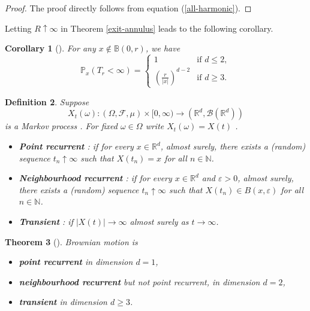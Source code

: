 \documentclass[11pt, a4paper, oneside]{report}
\numberwithin{equation}{section}
\newtheorem{theorem}{Theorem}[chapter]
\newtheorem{corollary}[theorem]{Corollary}
\newtheorem{definition}[theorem]{Definition}
\begin{document}
\begin{proof}
The proof directly follows from equation (\ref{all-harmonic}).
\end{proof}
\noindent Letting \( R \uparrow \infty \) in Theorem \ref{exit-annulus} leads to the following corollary.

\begin{corollary}[{\cite[Corollary 3.19]{PeresMortersBook}}]
For any \( x \notin \mathbb{B}(0, r) \), we have
\[
\mathbb{P}_x(T_r < \infty) =
\begin{cases}
1 & \text{if } d \leq 2, \\[10pt]
\displaystyle \left( \frac{r}{|x|} \right)^{d - 2} & \text{if } d \geq 3.
\end{cases}
\]
\end{corollary}
\begin{definition}
Suppose 
\[
X_t(\omega) : (\Omega, \mathscr{F}, \mathbb{\mu}) \times [0, \infty) \to (\mathbb{R}^d, \mathscr{B}(\mathbb{R}^d))
\] is a Markov process . For fixed \(\omega \in \Omega\) write \(X_t(\omega) = X(t)\) .
\begin{itemize}
    \item \textbf{Point recurrent} : if for every \( x \in \mathbb{R}^d \), almost surely, there exists a (random) sequence \( t_n \uparrow \infty \) such that \( X(t_n) = x \) for all \( n \in \mathbb{N} \).
    
    \item \textbf{Neighbourhood recurrent} : if for every \( x \in \mathbb{R}^d \) and \( \varepsilon > 0 \), almost surely, there exists a (random) sequence \( t_n \uparrow \infty \) such that \( X(t_n) \in B(x, \varepsilon) \) for all \( n \in \mathbb{N} \).
    
    \item \textbf{Transient} : if \( |X(t)| \to \infty \) almost surely as \( t \to \infty \).
\end{itemize}
\end{definition}
\begin{theorem}[{\cite[Theorem 3.20]{PeresMortersBook}}]
Brownian motion is
\begin{itemize}
    \item \textbf{point recurrent} in dimension \( d = 1 \),
    \item \textbf{neighbourhood recurrent} but not point recurrent, in dimension \( d = 2 \),
    \item \textbf{transient} in dimension \( d \geq 3 \).
\end{itemize}
\end{theorem}
\end{document}
